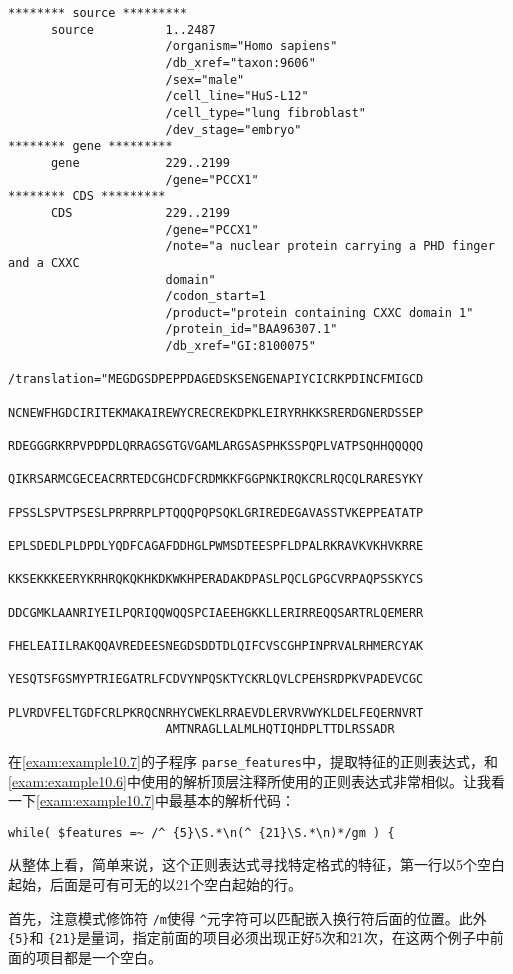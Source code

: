 \begin{lstlisting}[language={},basicstyle=\small\tt,breaklines=false]
******** source *********
      source          1..2487
                      /organism="Homo sapiens"
                      /db_xref="taxon:9606"
                      /sex="male"
                      /cell_line="HuS-L12"
                      /cell_type="lung fibroblast"
                      /dev_stage="embryo"
******** gene *********
      gene            229..2199
                      /gene="PCCX1"
******** CDS *********
      CDS             229..2199
                      /gene="PCCX1"
                      /note="a nuclear protein carrying a PHD finger and a CXXC
                      domain"
                      /codon_start=1
                      /product="protein containing CXXC domain 1"
                      /protein_id="BAA96307.1"
                      /db_xref="GI:8100075"
                      /translation="MEGDGSDPEPPDAGEDSKSENGENAPIYCICRKPDINCFMIGCD
                      NCNEWFHGDCIRITEKMAKAIREWYCRECREKDPKLEIRYRHKKSRERDGNERDSSEP
                      RDEGGGRKRPVPDPDLQRRAGSGTGVGAMLARGSASPHKSSPQPLVATPSQHHQQQQQ
                      QIKRSARMCGECEACRRTEDCGHCDFCRDMKKFGGPNKIRQKCRLRQCQLRARESYKY
                      FPSSLSPVTPSESLPRPRRPLPTQQQPQPSQKLGRIREDEGAVASSTVKEPPEATATP
                      EPLSDEDLPLDPDLYQDFCAGAFDDHGLPWMSDTEESPFLDPALRKRAVKVKHVKRRE
                      KKSEKKKEERYKRHRQKQKHKDKWKHPERADAKDPASLPQCLGPGCVRPAQPSSKYCS
                      DDCGMKLAANRIYEILPQRIQQWQQSPCIAEEHGKKLLERIRREQQSARTRLQEMERR
                      FHELEAIILRAKQQAVREDEESNEGDSDDTDLQIFCVSCGHPINPRVALRHMERCYAK
                      YESQTSFGSMYPTRIEGATRLFCDVYNPQSKTYCKRLQVLCPEHSRDPKVPADEVCGC
                      PLVRDVFELTGDFCRLPKRQCNRHYCWEKLRRAEVDLERVRVWYKLDELFEQERNVRT
                      AMTNRAGLLALMLHQTIQHDPLTTDLRSSADR
\end{lstlisting}

在\autoref{exam:example10.7}的子程序 \verb|parse_features|中，提取特征的正则表达式，和\autoref{exam:example10.6}中使用的解析顶层注释所使用的正则表达式非常相似。让我看一下\autoref{exam:example10.7}中最基本的解析代码：

\begin{lstlisting}
while( $features =~ /^ {5}\S.*\n(^ {21}\S.*\n)*/gm ) {
\end{lstlisting}

从整体上看，简单来说，这个正则表达式寻找特定格式的特征，第一行以5个空白起始，后面是可有可无的以21个空白起始的行。

首先，注意模式修饰符 \verb|/m|使得 \verb|^|元字符可以匹配嵌入换行符后面的位置。此外 \verb|{5}|和 \verb|{21}|是量词，指定前面的项目必须出现正好5次和21次，在这两个例子中前面的项目都是一个空白。

